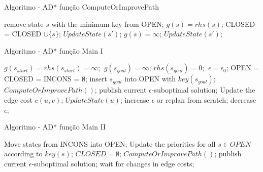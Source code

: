 \documentclass[10pt]{beamer}
\begin{document}
\begin{frame}{Algoritmo - AD* função ComputeOrImprovePath}
\begin{algorithm}[H]
\caption{ComputeOrImprovePath()}
\begin{algorithmic}[1]
\State remove state $s$ with the minimum key from OPEN;
\State $g(s) = rhs(s)$;
\State CLOSED = CLOSED $\cup \{s\}$;
 $UpdateState(s')$;
\EndFor
\Else 
\State $g(s) = \infty$;
 $UpdateState(s')$;
\EndFor
\EndIf
\EndWhile
\end{algorithmic}
\end{algorithm}
\end{frame}

\begin{frame}{Algoritmo - AD* função Main I}
\begin{algorithm}[H]
\caption{Main()}
\begin{algorithmic}[1]
\State $g(s_{start}) = rhs(s_{start}) = \infty$;
\State $\:g(s_{goal}) = \infty$;
\State $rhs(s_{goal}) = 0$; 
\State $\:\epsilon = \epsilon_0$;
\State OPEN = CLOSED = INCONS = $\emptyset$;
\State insert $s_{goal}$ into OPEN with $key(s_{goal})$;
\State $ComputeOrImprovePath()$;
\State publish current $\epsilon$-suboptimal solution;
\Loop
{}
\State Update the edge cost $c(u, v)$;
\State $UpdateState(u)$;
\EndFor
\EndIf
{}
\State increase $\epsilon$ or replan from scratch;
\Else {}
\State decrease $\epsilon$;
\EndIf
\EndIf
\EndLoop
\end{algorithmic}
\end{algorithm}
\end{frame}

\begin{frame}{Algoritmo - AD* função Main II}
\begin{algorithm}[H]
\caption{Main()}
\begin{algorithmic}[1]
\State \hspace{\algorithmicindent} Move states from INCONS into OPEN;
\State \hspace{\algorithmicindent} Update the priorities for all $s \in OPEN$ according to $key(s)$;
\State \hspace{\algorithmicindent} $CLOSED = \emptyset$;
\State \hspace{\algorithmicindent} $ComputeOrImprovePath()$;
\State \hspace{\algorithmicindent} publish current $\epsilon$-suboptimal solution; 
\State \hspace{\algorithmicindent} wait for changes in edge costs;
\EndIf
\end{algorithmic}
\end{algorithm}
\end{frame}
\end{document}
